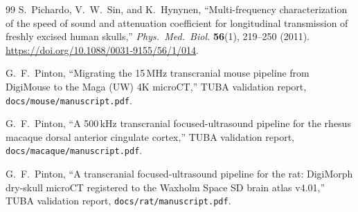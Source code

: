 \documentclass{compactarticle}
\begin{document}
\begin{thebibliography}{99}
 S.~Pichardo, V.~W.~Sin, and K.~Hynynen,
  ``Multi-frequency characterization of the speed of sound and
  attenuation coefficient for longitudinal transmission of freshly
  excised human skulls,''
  \emph{Phys.\ Med.\ Biol.} {\bf 56}(1), 219--250 (2011).
  \url{https://doi.org/10.1088/0031-9155/56/1/014}.

 G.~F.~Pinton,
  ``Migrating the 15\,MHz transcranial mouse pipeline from
  DigiMouse to the Maga (UW) 4K microCT,''
  TUBA validation report, \texttt{docs/mouse/manuscript.pdf}.

 G.~F.~Pinton,
  ``A 500\,kHz transcranial focused-ultrasound pipeline for the
  rhesus macaque dorsal anterior cingulate cortex,''
  TUBA validation report, \texttt{docs/macaque/manuscript.pdf}.

 G.~F.~Pinton,
  ``A transcranial focused-ultrasound pipeline for the rat:
  DigiMorph dry-skull microCT registered to the Waxholm Space
  SD brain atlas v4.01,''
  TUBA validation report, \texttt{docs/rat/manuscript.pdf}.

\end{thebibliography}
\end{document}
